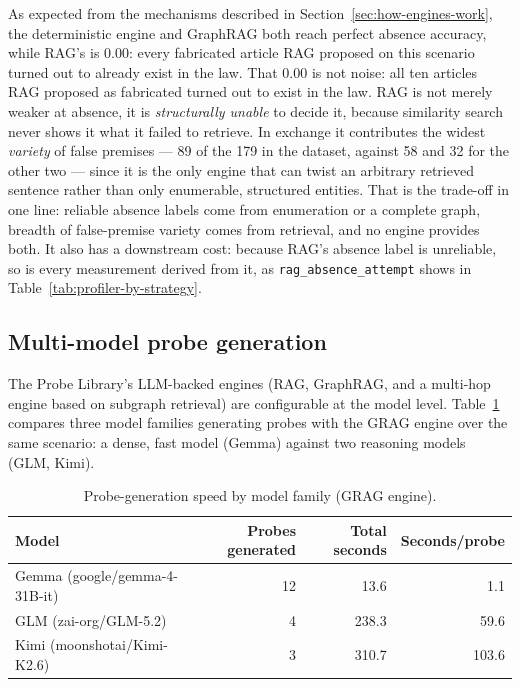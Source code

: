 \documentclass[11pt,a4paper]{article}
\begin{document}
As expected from the mechanisms described in
Section~\ref{sec:how-engines-work}, the deterministic engine and GraphRAG both
reach perfect absence accuracy, while RAG's is $0.00$: every fabricated
article RAG proposed on this scenario turned out to already exist in the law.
That $0.00$ is not noise: all ten articles RAG proposed as fabricated turned out to exist
in the law. RAG is not merely weaker at absence, it is \emph{structurally unable} to decide
it, because similarity search never shows it what it failed to retrieve. In exchange it
contributes the widest \emph{variety} of false premises --- 89 of the 179 in the dataset,
against 58 and 32 for the other two --- since it is the only engine that can twist an
arbitrary retrieved sentence rather than only enumerable, structured entities. That is the
trade-off in one line: reliable absence labels come from enumeration or a complete graph,
breadth of false-premise variety comes from retrieval, and no engine provides both. It also
has a downstream cost: because RAG's absence label is unreliable, so is every measurement
derived from it, as \texttt{rag\_absence\_attempt} shows in
Table~\ref{tab:profiler-by-strategy}.

\subsection{Multi-model probe generation}
\label{sec:multimodel}

The Probe Library's LLM-backed engines (RAG, GraphRAG, and a multi-hop engine
based on subgraph retrieval) are configurable at the model level.
Table~\ref{tab:multimodel} compares three model
families generating probes with the GRAG engine over the same scenario: a dense,
fast model (Gemma) against two reasoning models (GLM, Kimi).

\begin{table}[ht]
\centering
\caption{Probe-generation speed by model family (GRAG engine).}
\label{tab:multimodel}
\begin{tabular}{lrrr}
\toprule
Model & Probes generated & Total seconds & Seconds/probe \\
\midrule
Gemma (google/gemma-4-31B-it)   & 12 & 13.6  & 1.1 \\
GLM (zai-org/GLM-5.2)           & 4  & 238.3 & 59.6 \\
Kimi (moonshotai/Kimi-K2.6)     & 3  & 310.7 & 103.6 \\
\bottomrule
\end{tabular}
\end{table}
\end{document}
